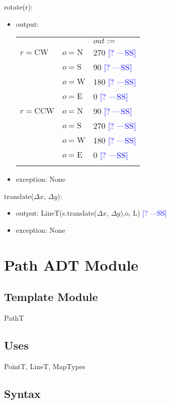 \documentclass[12pt]{article}
\newcommand{\authornote}[3]{\textcolor{#1}{[#3 ---#2]}}
\newcommand{\authornote}[3]{}
\newcommand{\wss}[1]{\authornote{blue}{SS}{#1}}
\begin{document}
\noindent rotate(r):
\begin{itemize}
\item output: 
\begin{tabular}{|p{}|p{2.3cm}|l|}
\hhline{~|~|-|}
\multicolumn{1}{r}{} & \multicolumn{1}{r|}{} & \multicolumn{1}{l|}{$out :=$}\\
\hhline{|-|-|-|}
$r = \mbox{CW}$ & $o = \mbox{N}$ & 270 \wss{?}\\
\hhline{|~|-|-|}
~ & $o = \mbox{S}$ & 90 \wss{?}\\
\hhline{|~|-|-|}
~ & $o = \mbox{W}$ & 180 \wss{?}\\
\hhline{|~|-|-|}
~ & $o = \mbox{E}$ & 0 \wss{?}\\
\hhline{-|-|-|}
$r = \mbox{CCW}$ & $o = \mbox{N}$ & 90 \wss{?}\\
\hhline{|~|-|-|}
~ & $o = \mbox{S}$ & 270 \wss{?}\\
\hhline{|~|-|-|}
~ & $o = \mbox{W}$ & 180 \wss{?}\\
\hhline{|~|-|-|}
~ & $o = \mbox{E}$ & 0 \wss{?}\\
\hhline{-|-|-|}
\end{tabular}

\item exception: None
\end{itemize}

\noindent translate($\Delta x$, $\Delta y$):
\begin{itemize}
\item output: \mbox{LineT}(s.translate($\Delta x$, $\Delta y$),o, L) \wss{?}
\item exception: None
\end{itemize}

\newpage

\section* {Path ADT Module}

\subsection*{Template Module}

PathT

\subsection* {Uses}

PointT, LineT, MapTypes

\subsection* {Syntax}
\end{document}
